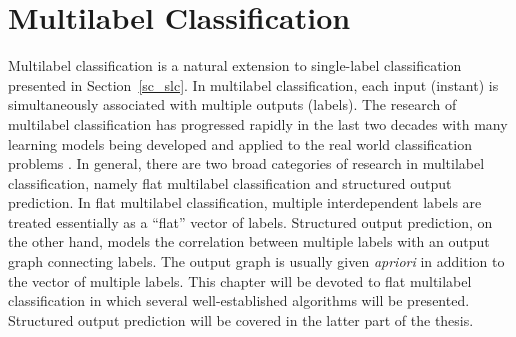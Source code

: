 {




%
%
\chapter{Multilabel Classification} \label{ch_fmlc}

Multilabel classification is a natural extension to single-label classification presented in Section~\ref{sc_slc}.
In multilabel classification, each input (instant) is simultaneously associated with multiple outputs (labels).
The research of multilabel classification has progressed rapidly in the last two decades with many learning models being developed and applied to the real world classification problems \citep{lafferty01,taskar02,Taskar04max,THJA04,Rousu07}.
In general, there are two broad categories of research in multilabel classification, namely flat multilabel classification and structured output prediction.
In flat multilabel classification, multiple interdependent labels are treated essentially as a ``flat'' vector of labels.
Structured output prediction, on the other hand, models the correlation between multiple labels with an output graph connecting labels.
The output graph is usually given \textit{apriori} in addition to the vector of multiple labels.
This chapter will be devoted to flat multilabel classification in which several well-established algorithms will be presented.
Structured output prediction will be covered in the latter part of the thesis.

}

